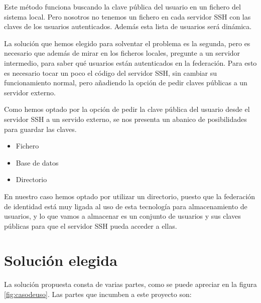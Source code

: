     Este método funciona buscando la clave pública del usuario en un
    fichero del sistema local. Pero nosotros no tenemos un fichero en cada
    servidor SSH con las claves de los usuarios autenticados. Además esta
    lista de usuarios será dinámica.

    La solución que hemos elegido para solventar el problema es la segunda,
    pero es necesario que además de mirar en los ficheros locales, pregunte
    a un servidor intermedio, para saber qué usuarios están autenticados en
    la federación. Para esto es necesario tocar un poco el código del
    servidor SSH, sin cambiar su funcionamiento normal, pero añadiendo la
    opción de pedir claves públicas a un servidor externo.

    Como hemos optado por la opción de pedir la clave pública del usuario
    desde el servidor SSH a un servido externo, se nos presenta un abanico
    de posibilidades para guardar las claves.

    \begin{itemize}
    
    \item Fichero
    \item Base de datos
    \item Directorio

    \end{itemize}

    En nuestro caso hemos optado por utilizar un directorio, puesto que la
    federación de identidad está muy ligada al uso de esta tecnología para
    almacenamiento de usuarios, y lo que vamos a almacenar es un conjunto
    de usuarios y sus claves públicas para que el servidor SSH pueda
    acceder a ellas.

    \section{Solución elegida}

    La solución propuesta consta de varias partes, como se puede apreciar
    en la figura \ref{fig:casodeuso}. Las partes que incumben a este
    proyecto son:

